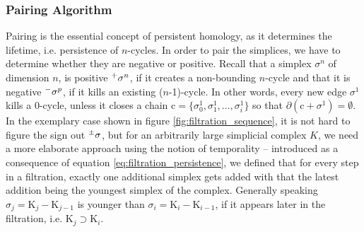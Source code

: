 \subsubsection{Pairing Algorithm}
\label{math_algorithm_pairing}

Pairing is the essential concept of persistent homology, as it determines the lifetime, i.e. persistence of $n$-cycles.
In order to pair the simplices, we have to determine whether they are negative or positive.
Recall that a simplex $\sigma^{n}$ of dimension $n$, is positive $\Prefix^{+}{\sigma^{n}}$, if it creates a non-bounding $n$-cycle and that it is negative $\Prefix^{-}{\sigma^{p}}$, if it kills an existing ($n$-1)-cycle.
In other words, every new edge $\sigma^{1}$ kills a $0$-cycle, unless it closes a chain $\mathrm{c} = \{ \sigma^{1}_{0}, \sigma^{1}_{1}, \dots , \sigma^{1}_{i} \}$ so that $\partial (\mathrm{c} + \sigma^{1}) = \emptyset$.
In the exemplary case shown in figure \ref{fig:filtration_sequence}, it is not hard to figure the sign out $\Prefix^{\pm}{\sigma}$, but for an arbitrarily large simplicial complex $K$, we need a more elaborate approach using the notion of temporality -- introduced as a consequence of equation \eqref{eq:filtration_persistence}, we defined that for every step in a filtration, exactly one additional simplex gets added with that the latest addition being the youngest simplex of the complex.
Generally speaking $\sigma_{j} = \mathrm{K}_{j} - \mathrm{K}_{j-1}$ is younger than $\sigma_{i} = \mathrm{K}_{i} - \mathrm{K}_{i-1}$, if it appears later in the filtration, i.e. $\mathrm{K}_{j} \supset \mathrm{K}_{i}$.


